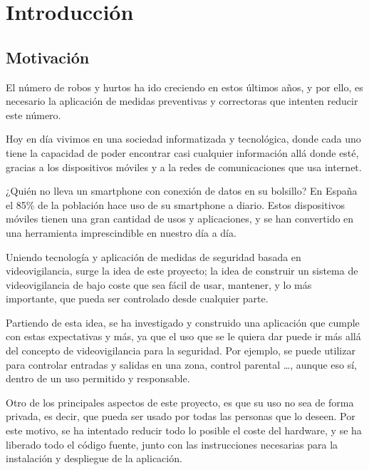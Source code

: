 
\pagestyle{miEstilo1}

\section{Introducción}

\subsection{Motivación}

El número de robos y hurtos ha ido creciendo en estos últimos años, y por ello, es necesario la aplicación de medidas preventivas y correctoras que intenten reducir este número.

Hoy en día vivimos en una sociedad informatizada y tecnológica, donde cada uno tiene la capacidad de poder encontrar casi cualquier información allá donde esté, gracias a los dispositivos móviles y a la redes de comunicaciones que usa internet.

¿Quién no lleva un smartphone con conexión de datos en su bolsillo? En España el 85\% de la población hace uso de su smartphone a diario. Estos dispositivos móviles tienen una gran cantidad de usos y aplicaciones, y se han convertido en una herramienta imprescindible en nuestro día a día.

Uniendo tecnología y aplicación de medidas de seguridad basada en videovigilancia, surge la idea de este proyecto; la idea de construir un sistema de videovigilancia de bajo coste que sea fácil de usar, mantener, y lo más importante, que pueda ser controlado desde cualquier parte.

Partiendo de esta idea, se ha investigado y construido una aplicación que cumple con estas expectativas y más, ya que el uso que se le quiera dar puede ir más allá del concepto de videovigilancia para la seguridad. Por ejemplo, se puede utilizar para controlar entradas y salidas en una zona, control parental \ldots, aunque eso sí, dentro de un uso permitido y responsable.

Otro de los principales aspectos de este proyecto, es que su uso no sea de forma privada, es decir, que pueda ser usado por todas las personas que lo deseen. Por este motivo, se ha intentado reducir todo lo posible el coste del hardware, y se ha liberado todo el código fuente, junto con las instrucciones necesarias para la instalación y despliegue de la aplicación.

